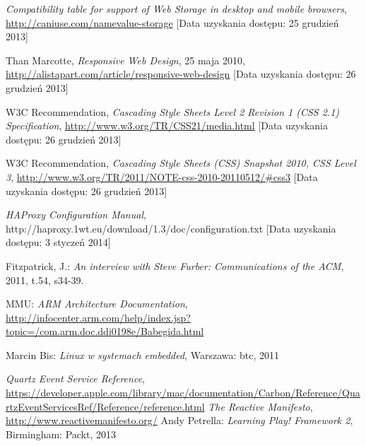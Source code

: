 \begin{thebibliography}{1}
   \emph{Compatibility table for support of Web Storage in desktop and mobile browsers}, \url{http://caniuse.com/namevalue-storage} [Data uzyskania dostępu: 25 grudzień 2013]
  
   Than Marcotte, \emph{Responsive Web Design}, 25 maja 2010, \url{http://alistapart.com/article/responsive-web-design} [Data uzyskania dostępu: 26 grudzień 2013]

   W3C Recommendation, \emph{Cascading Style Sheets Level 2 Revision 1 (CSS 2.1) Specification}, \url{http://www.w3.org/TR/CSS21/media.html} [Data uzyskania dostępu: 26 grudzień 2013]

   W3C Recommendation, \emph{Cascading Style Sheets (CSS) Snapshot 2010, CSS Level 3}, \url{http://www.w3.org/TR/2011/NOTE-css-2010-20110512/\#css3} [Data uzyskania dostępu: 26 grudzień 2013]

   \emph{HAProxy Configuration Manual}, http://haproxy.1wt.eu/download/1.3/doc/configuration.txt [Data uzyskania dostępu: 3 styczeń 2014]

  Fitzpatrick, J.: \emph{An interview with Steve Furber: Communications of the ACM}, 2011, t.54, s34-39.
  
  MMU: \emph{ARM Architecture Documentation}, \url{http://infocenter.arm.com/help/index.jsp?topic=/com.arm.doc.ddi0198e/Babegida.html}

  Marcin Bis: \emph{Linux w systemach embedded}, Warszawa: btc, 2011

   \emph{Quartz Event Service Reference}, \url{https://developer.apple.com/library/mac/documentation/Carbon/Reference/QuartzEventServicesRef/Reference/reference.html}
   \emph{The Reactive Manifesto}, \url{http://www.reactivemanifesto.org/}
  Andy Petrella: \emph{Learning Play! Framework 2}, Birmingham: Packt, 2013 
\end{thebibliography}

\newpage
\listoftables

\listoffigures












